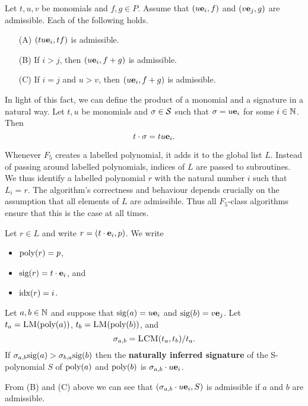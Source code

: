 \begin{proposition}
Let $t,u,v$ be monomials and $f,g\in P$.
Assume that $(u\mathbf{e}_i,f)$ and $(v\mathbf{e}_j,g)$ are admissible.
Each of the following holds.
\begin{itemize}
\item[(A)] $(tu\mathbf{e}_i, tf)$ is admissible.
\item[(B)] If $i > j$, then $(u\mathbf{e}_i,f+g)$ is admissible.
\item[(C)] If $i = j$ and $u > v$, then $(u\mathbf{e}_i,f+g)$ is admissible.
\end{itemize}
\end{proposition}

In light of this fact, we can define the product of a monomial and a signature in a natural way. Let $t,u$ be monomials and $\sigma\in\mathcal{S}$ such that
$\sigma=u\mathbf{e}_i$ for some $i\in \mathbb{N}$. Then\[
t\cdot\sigma = tu\mathbf{e}_i.
\]

Whenever $F_5$ creates a labelled polynomial, it adds it to the global list $L$. Instead of passing around labelled polynomials, indices of $L$ are passed to subroutines. We thus identify a labelled polynomial $r$ with the natural number $i$ such that $L_i = r$. The algorithm's correctness and behaviour depends crucially on the assumption that all elements of $L$ are admissible. Thus all $F_5$-class algorithms ensure that this is the case at all times.

\begin{notation}
Let $r \in L$ and write $r= (t \cdot \mathbf{e}_i, p)$. We write
\begin{itemize}
 \item $\textnormal{poly}(r) = p$,
 \item $\textnormal{sig}(r) = t \cdot \mathbf{e}_i$, and
 \item $\textnormal{idx}(r) = i$.
\end{itemize}
\end{notation}

\begin{definition}
Let $a,b\in \mathbb{N}$ and suppose that $\textnormal{sig}(a)=u\mathbf{e}_i$ and $\textnormal{sig}(b)=v\mathbf{e}_j$.
Let $t_a = \textsc{LM}(\textnormal{poly}(a))$, $t_b = \textsc{LM}(\textnormal{poly}(b))$, and $$\sigma_{a,b} = \textsc{LCM}(t_a,t_b)/t_a.$$
If $\sigma_{a,b} \textnormal{sig}(a) > \sigma_{b,a} \textnormal{sig}(b)$ then
the \textbf{naturally inferred signature} of the S-polynomial $S$ of $\textnormal{poly}(a)$ and $\textnormal{poly}(b)$ is $\sigma_{a,b}\cdot u\mathbf{e}_i$.
\end{definition}

From (B) and (C) above we can see that $(\sigma_{a,b}\cdot u\mathbf{e}_i,S)$ is admissible if $a$ and $b$ are admissible.


